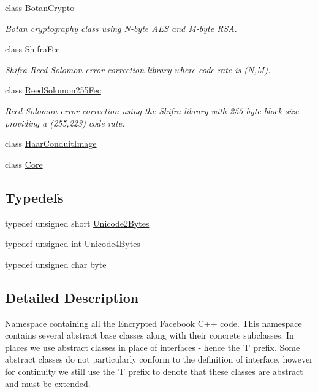 \begin{DoxyCompactItemize}
class \hyperlink{classefb_1_1BotanCrypto}{BotanCrypto}
\begin{DoxyCompactList}\small\item\em Botan cryptography class using N-\/byte AES and M-\/byte RSA. \item\end{DoxyCompactList}\item 
class \hyperlink{classefb_1_1ShifraFec}{ShifraFec}
\begin{DoxyCompactList}\small\item\em Shifra Reed Solomon error correction library where code rate is (N,M). \item\end{DoxyCompactList}\item 
class \hyperlink{classefb_1_1ReedSolomon255Fec}{ReedSolomon255Fec}
\begin{DoxyCompactList}\small\item\em Reed Solomon error correction using the Shifra library with 255-\/byte block size providing a (255,223) code rate. \item\end{DoxyCompactList}\item 
class \hyperlink{classefb_1_1HaarConduitImage}{HaarConduitImage}
\item 
class \hyperlink{classefb_1_1Core}{Core}
\end{DoxyCompactItemize}
\subsection*{Typedefs}
\begin{DoxyCompactItemize}
\item 
typedef unsigned short \hyperlink{namespaceefb_acce95f2192212162af47fde5af397bea}{Unicode2Bytes}
\item 
typedef unsigned int \hyperlink{namespaceefb_aa0d3cfad43f6f1a2056b87427ada3b74}{Unicode4Bytes}
\item 
typedef unsigned char \hyperlink{namespaceefb_a0c8186d9b9b7880309c27230bbb5e69d}{byte}
\end{DoxyCompactItemize}


\subsection{Detailed Description}
Namespace containing all the Encrypted Facebook C++ code. This namespace contains several abstract base classes along with their concrete subclasses. In places we use abstract classes in place of interfaces -\/ hence the 'I' prefix. Some abstract classes do not particularly conform to the definition of interface, however for continuity we still use the 'I' prefix to denote that these classes are abstract and must be extended.

